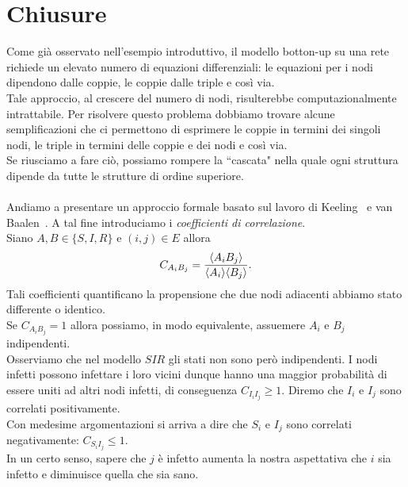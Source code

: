 \section{Chiusure}
Come gi\`a osservato nell'esempio introduttivo, il modello botton-up su una rete richiede un elevato numero di equazioni differenziali: le equazioni per i nodi dipendono dalle coppie, le coppie dalle triple e cos\`i via.\\
Tale approccio, al crescere del numero di nodi, risulterebbe computazionalmente intrattabile. Per risolvere questo problema dobbiamo trovare alcune semplificazioni che ci permettono di esprimere le coppie in termini dei singoli nodi, le triple in termini delle coppie e dei nodi e cos\`i via.\\
Se riusciamo a fare ci\`o, possiamo rompere la ``cascata" nella quale ogni struttura dipende da tutte le strutture di ordine superiore.\\ \\
Andiamo a presentare un approccio formale basato sul lavoro di Keeling~\cite{keeling1995ecology}  e van Baalen~\cite{van2000pair}.  A tal fine introduciamo i  \textit{coefficienti di correlazione}.\\
Siano $A, B\in \{ S, I,R\}$ e $(i,j)\in E$ allora 
$$C_{A_i B_j} = \frac{\langle A_i B_j \rangle}{\langle A_i \rangle \langle B_j \rangle}.$$
Tali coefficienti quantificano la propensione che due nodi adiacenti abbiamo stato differente o identico.\\
Se $C_{A_iB_j}=1$ allora possiamo, in modo equivalente, assuemere  $A_i$ e $B_j$ indipendenti.\\
Osserviamo che nel modello $SIR$ gli stati non sono per\`o indipendenti. I nodi infetti possono infettare i loro vicini dunque hanno una maggior probabilit\`a di essere uniti ad altri nodi infetti,  di conseguenza  $C_{I_i I_j}\geq 1$.  Diremo che $I_i$ e $I_j$ sono correlati positivamente.\\
Con medesime argomentazioni si arriva a dire che $S_i$ e $I_j$ sono correlati negativamente: $C_{S_i I_j}\leq 1$.\\
 In un certo senso, sapere che $j$ \`e infetto aumenta la nostra aspettativa  che $i$ sia infetto e diminuisce quella che sia sano.\\
 
